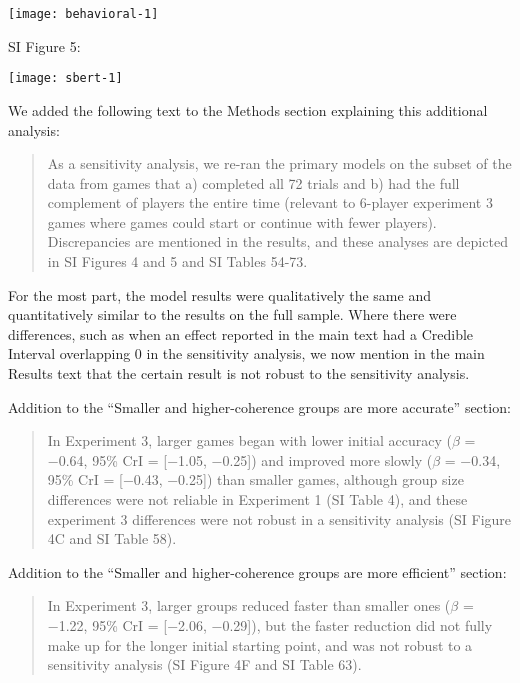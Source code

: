 \documentclass{stanfordletter}
\newcommand{\revised}[1]{\begin{quote}	#1 \end{quote}}
\begin{document}
\begin{letter}{}
          	{\begin{center} \texttt{[image: behavioral-1]}\end{center}}

SI Figure 5:

          	{\begin{center} \texttt{[image: sbert-1]}\end{center}}
          
          We added the following text to the Methods section explaining this additional analysis:
          

          \revised{As a sensitivity analysis, we re-ran the primary models on the subset of the data from games that a) completed all 72 trials and b) had the full complement of players the entire time (relevant to 6-player experiment 3 games where games could start or continue with fewer players). Discrepancies are mentioned in the results, and these analyses are depicted in SI Figures 4 and 5 and SI Tables 54-73.}
          
          For the most part, the model results were qualitatively the same and quantitatively similar to the results on the full sample. Where there were differences, such as when an effect reported in the main text had a Credible Interval overlapping 0 in the sensitivity analysis, we now mention in the main Results text that the certain result is not robust to the sensitivity analysis. 


          Addition to the ``Smaller and higher-coherence groups are more accurate'' section: 
          \revised{In Experiment 3, larger games began with
          	lower initial accuracy ($\beta$ = −0.64, 95\% CrI = [−1.05, −0.25]) and improved more slowly ($\beta$ =
          	−0.34, 95\% CrI = [−0.43, −0.25]) than smaller games, although group size differences were not
          	reliable in Experiment 1 (SI Table 4), and these experiment 3 differences were not robust in a 
          	sensitivity	analysis (SI	Figure 4C and SI Table 58).}
          
          
          Addition to the ``Smaller and higher-coherence groups are more efficient'' section: 
          \revised{In
          	Experiment 3, larger groups reduced faster than smaller ones ($\beta$ = −1.22, 95\% CrI = [−2.06, −0.29]),
          	but the faster reduction did not fully make up for the longer initial starting point, and was not robust to a sensitivity analysis (SI Figure 4F and SI Table
          	63).}
          	

\end{letter}
\end{document}
